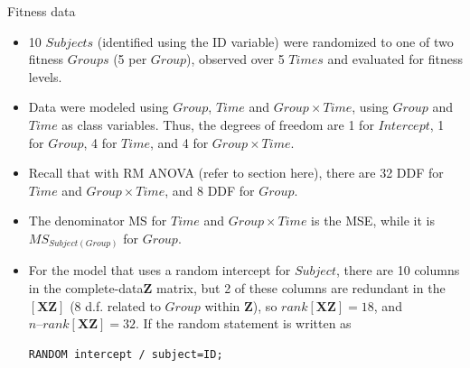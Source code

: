 \documentclass[
  9pt,
  ignorenonframetext,
]{beamer}
\begin{document}
\begin{frame}[fragile]{Fitness data}
\protect\hypertarget{fitness-data}{}
\begin{itemize}
\item
  10 \(Subjects\) (identified using the ID variable) were randomized to
  one of two fitness \(Groups\) (5 per \(Group\)), observed over 5
  \(Times\) and evaluated for fitness levels.
\item
  Data were modeled using \(Group\), \(Time\) and \(Group \times Time\),
  using \(Group\) and \(Time\) as class variables. Thus, the degrees of
  freedom are 1 for \(Intercept\), 1 for \(Group\), 4 for \(Time\), and
  4 for \(Group \times Time\).
\item
  Recall that with RM ANOVA (refer to section here), there are 32 DDF
  for \(Time\) and \(Group \times Time\), and 8 DDF for \(Group\).
\item
  The denominator MS for \(Time\) and \(Group \times Time\) is the MSE,
  while it is \(MS_{Subject(Group)}\) for \(Group\).
\item
  For the model that uses a random intercept for \(Subject\), there are
  10 columns in the complete-data\(\pmb Z\) matrix, but 2 of these
  columns are redundant in the \([\pmb{X Z}]\) (8 d.f. related to
  \(Group\) within \(\pmb Z\)), so \(rank[\pmb {XZ}]=18\), and
  \(n–rank[\pmb {XZ}]=32\). If the random statement is written as

\begin{verbatim}
RANDOM intercept / subject=ID;
\end{verbatim}
\end{itemize}
\end{frame}
\end{document}
